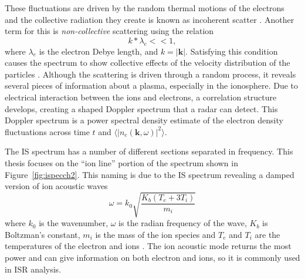 These fluctuations are driven by the random thermal motions of the electrons and the collective radiation they create is known as incoherent scatter \citep{kudeki:milla:1}. Another term for this is \textit{non-collective} scattering using the relation
\begin{equation}
\label{eqn:incohorig}
k*\lambda_{e} << 1,
\end{equation}
where $\lambda_{e}$ is the electron Debye length, and $k=|\mathbf{k}|$. Satisfying this condition causes the spectrum to show collective effects of the velocity distribution of the particles \citep{sheffield2010}.
Although the scattering is driven through a random process, it reveals several pieces of information about a plasma, especially in the ionosphere. Due to electrical interaction between the ions and electrons, a correlation structure develops, creating a shaped Doppler spectrum that a radar can detect. This Doppler spectrum is a power spectral density estimate of the electron density fluctuations across time $t$ and $\langle \left|n_e(\mathbf{k},\omega)\right|^2\rangle$.

The IS spectrum has a number of different sections separated in frequency.
This thesis focuses on the ``ion line'' portion of the spectrum shown in Figure~\ref{fig:ispecch2}. This naming is due to the IS spectrum revealing a damped version of ion acoustic waves
\begin{equation} 
\label{eqn:ial}
\omega=k_0\sqrt{\frac{K_b(T_e+3T_i)}{m_i}}
\end{equation}
where $k_0$ is the wavenumber, $\omega$ is the radian frequency of the wave, $K_b$ is Boltzman's constant, $m_i$ is the mass of the ion species and $T_e$ and $T_i$ are the temperatures of the electron and ions \citep{chen1984introduction}. 
The ion acoustic mode returns the most power and can give information on both electron and ions, so it is commonly used in ISR analysis.

